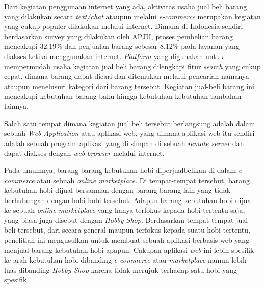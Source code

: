 \documentclass[a4paper]{article}
\begin{document}
Dari kegiatan penggunaan internet yang ada, aktivitas usaha jual beli barang yang dilakukan secara \textit{text/chat} ataupun melalui \textit{e-commerce} merupakan kegiatan yang cukup populer dilakukan melalui internet. Dimana di Indonesia sendiri berdasarkan survey yang dilakukan oleh APJII, proses pembelian barang mencakupi 32.19\% dan penjualan barang sebesar 8.12\% pada layanan yang diakses ketika menggunakan internet\autocite{indonesia2017infografis}. \textit{Platform} yang digunakan untuk mempermudah usaha kegiatan jual beli barang dilengkapi fitur \textit{search} yang cukup cepat, dimana barang dapat dicari dan ditemukan melalui pencarian namanya ataupun menelusuri kategori dari barang tersebut. Kegiatan jual-beli barang ini mencakupi kebutuhan barang baku hingga kebutuhan-kebutuhan tambahan lainnya.

Salah satu tempat dimana kegiatan jual beli tersebut berlangsung adalah dalam sebuah \textit{Web Application} atau aplikasi web, yang dimana aplikasi web itu sendiri adalah sebuah program aplikasi yang di simpan di sebuah \textit{remote server} dan dapat diakses dengan \textit{web browser} melalui internet\autocite{what-is-web-app}.

Pada umumnya, barang-barang kebutuhan hobi diperjualbelikan di dalam \textit{e-commerce} atau sebuah \textit{online marketplace}. Di tempat-tempat tersebut, barang kebutuhan hobi dijual bersamaan dengan barang-barang lain yang tidak berhubungan dengan hobi-hobi tersebut. Adapun barang kebutuhan hobi dijual ke sebuah \textit{online marketplace} yang hanya terfokus kepada hobi tertentu saja, yang biasa juga disebut dengan \textit{Hobby Shop}. Berdasarkan tempat-tempat jual beli tersebut, dari secara general maupun terfokus kepada suatu hobi tertentu, penelitian ini mengusulkan untuk membuat sebuah aplikasi berbasis web yang menjual barang kebutuhan hobi apapun. Cakupan aplikasi \textit{web} ini lebih spesifik ke arah kebutuhan hobi dibanding \textit{e-commerce} atau \textit{marketplace} namun lebih luas dibanding \textit{Hobby Shop} karena tidak merujuk terhadap satu hobi yang spesifik.
\end{document}
